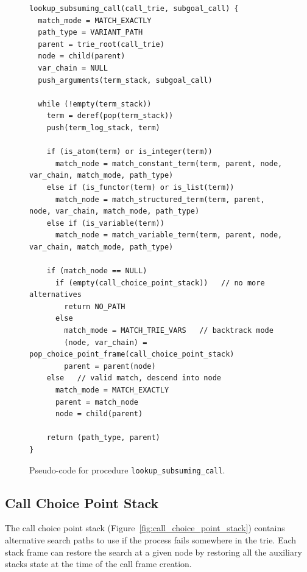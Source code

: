\begin{figure}[ht]
\begin{Verbatim}
lookup_subsuming_call(call_trie, subgoal_call) {
  match_mode = MATCH_EXACTLY
  path_type = VARIANT_PATH
  parent = trie_root(call_trie)
  node = child(parent)
  var_chain = NULL
  push_arguments(term_stack, subgoal_call)

  while (!empty(term_stack))
    term = deref(pop(term_stack))
    push(term_log_stack, term)
  
    if (is_atom(term) or is_integer(term))
      match_node = match_constant_term(term, parent, node, var_chain, match_mode, path_type)
    else if (is_functor(term) or is_list(term))
      match_node = match_structured_term(term, parent, node, var_chain, match_mode, path_type)
    else if (is_variable(term))
      match_node = match_variable_term(term, parent, node, var_chain, match_mode, path_type)
  
    if (match_node == NULL)
      if (empty(call_choice_point_stack))   // no more alternatives
        return NO_PATH
      else
        match_mode = MATCH_TRIE_VARS   // backtrack mode
        (node, var_chain) = pop_choice_point_frame(call_choice_point_stack)
        parent = parent(node)
    else   // valid match, descend into node
      match_mode = MATCH_EXACTLY
      parent = match_node
      node = child(parent)
      
    return (path_type, parent)
}
\end{Verbatim}
\caption{Pseudo-code for procedure \texttt{lookup\_subsuming\_call}.}
\label{fig:lookup_subsuming_call}
\end{figure}

\subsection{Call Choice Point Stack}

The call choice point stack (Figure~\ref{fig:call_choice_point_stack}) contains alternative
search paths to use if the process fails somewhere in the trie.
Each stack frame can restore the search at a given node by restoring all the auxiliary stacks state at the time
of the call frame creation.

